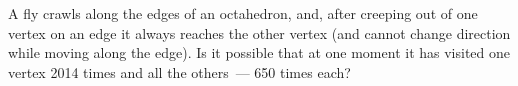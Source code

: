 \problem
A fly crawls along the edges of an octahedron, and, after creeping out of one
vertex on an edge it always reaches the other vertex (and cannot change
direction while moving along the edge).
Is it possible that at one moment it has visited one vertex 2014 times and all
the others~--- 650 times each?
\solution
\endproblem

